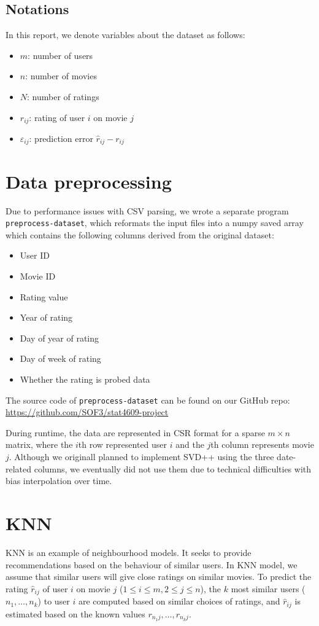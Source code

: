\documentclass[final]{cvpr}
\begin{document}
\subsection{Notations}
In this report, we denote variables about the dataset as follows:
\begin{itemize}
	\item $m$: number of users
	\item $n$: number of movies
	\item $N$: number of ratings
	\item $r_{ij}$: rating of user $i$ on movie $j$
	\item $\varepsilon_{ij}$: prediction error $\hat r_{ij} - r_{ij}$
\end{itemize}

\section{Data preprocessing}
Due to performance issues with CSV parsing, we wrote a separate program \texttt{preprocess-dataset},
which reformats the input files into a numpy saved array
which contains the following columns derived from the original dataset:

\begin{itemize}
	\item User ID
	\item Movie ID
	\item Rating value
	\item Year of rating
	\item Day of year of rating
	\item Day of week of rating
	\item Whether the rating is probed data
\end{itemize}

The source code of \texttt{preprocess-dataset} can be found on our GitHub repo:
\url{https://github.com/SOF3/stat4609-project}

During runtime, the data are represented in \ac{CSR} format
for a sparse $m \times n$ matrix,
where the $i$th row represented user $i$ and the $j$th column represents movie $j$.
Although we originall planned to implement SVD++ using the three date-related columns,
we eventually did not use them due to technical difficulties with bias interpolation over time.

\section{\ac{KNN}}
\ac{KNN} is an example of neighbourhood models.
It seeks to provide recommendations based on the behaviour of similar users.
In \ac{KNN} model, we assume that similar users will give close ratings on similar movies.
To predict the rating $\hat r_{ij}$ of user $i$ on movie $j$ ($1 \le i \le m, 2 \le j \le n$),
the $k$ most similar users ($n_1, \ldots, n_k$) to user $i$ are computed based on similar choices of ratings,
and $\hat r_{ij}$ is estimated based on the known values $r_{n_1j}, \ldots, r_{n_kj}$.
\end{document}
